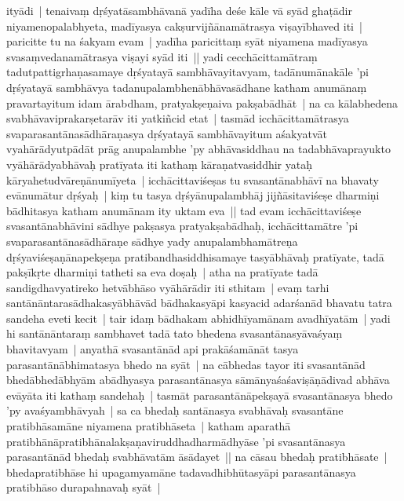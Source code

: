 \documentclass[article,a4paper]{memoir}
\begin{document}
	  \pstart ityā\-di | tenaivaṃ dṛśyatā\-sambhā\-vanā\- yadī\-ha deśe kā\-le vā\- syā\-d ghaṭā\-dir niyamenopalabhyeta, madī\-yasya cakṣurvijñā\-namā\-trasya viṣayī\-bhaved iti | paricitte tu na śakyam evam | yadī\-ha paricittaṃ syā\-t niyamena madī\-yasya svasaṃvedanamā\-trasya viṣayi syā\-d iti || \label{thakur75-146.26} yadi cecchā\-cittamā\-traṃ tadutpattigrhaṇasamaye dṛśyatayā\- sambhā\-vayitavyam, tadā\-numā\-nakā\-le 'pi dṛśyatayā\- sambhā\-vya tadanupalambhenā\-bhā\-vasā\-dhane katham anumā\-naṃ pravartayitum idam ā\-rabdham, pratyakṣeṇaiva pakṣabā\-dhā\-t | na ca kā\-labhedena svabhā\-vaviprakarṣetarā\-v iti yatkiñcid etat | tasmā\-d icchā\-cittamā\-trasya svaparasantā\-nasā\-dhā\-raṇasya dṛśyatayā\- sambhā\-vayitum aśakyatvā\-t vyahā\-rā\-dyutpā\-dā\-t prā\-g anupalambhe 'py abhā\-vasiddhau na tadabhā\-vaprayukto vyā\-hā\-rā\-dyabhā\-vaḥ pratī\-yata iti kathaṃ kā\-raṇatvasiddhir yataḥ kā\-ryahetudvā\-reṇā\-numī\-yeta | icchā\-cittaviśeṣas tu svasantā\-nabhā\-vī\- na bhavaty evā\-numā\-tur dṛśyaḥ | kiṃ tu tasya dṛśyā\-nupalambhā\-j jijñā\-sitaviśeṣe dharmiṇi bā\-dhitasya katham anumā\-nam ity uktam eva || \label{thakur75-147.1} tad evam icchā\-cittaviśeṣe svasantā\-nabhā\-vini sā\-dhye pakṣasya pratyakṣabā\-dhaḥ, icchā\-cittamā\-tre 'pi svaparasantā\-nasā\-dhā\-raṇe sā\-dhye yady anupalambhamā\-treṇa dṛśyaviśeṣaṇā\-napekṣeṇa pratibandhasiddhisamaye tasyā\-bhā\-vaḥ pratī\-yate, tadā\- pakṣī\-kṛte dharmiṇi tatheti sa eva doṣaḥ | atha na pratī\-yate tadā\- sandigdhavyatireko hetvā\-bhā\-so vyā\-hā\-rā\-dir iti sthitam | \label{thakur75-147.6} evaṃ tarhi santā\-nā\-ntarasā\-dhakasyā\-bhā\-vā\-d bā\-dhakasyā\-pi kasyacid adarśanā\-d bhavatu tatra sandeha eveti kecit | tair idaṃ bā\-dhakam abhidhī\-yamā\-nam avadhī\-yatā\-m | yadi hi santā\-nā\-ntaraṃ sambhavet tadā\- tato bhedena svasantā\-nasyā\-vaśyaṃ bhavitavyam | anyathā\- svasantā\-nā\-d api prakā\-śamā\-nā\-t tasya parasantā\-nā\-bhimatasya bhedo na syā\-t | na cā\-bhedas tayor iti svasantā\-nā\-d bhedā\-bhedā\-bhyā\-m abā\-dhyasya parasantā\-nasya sā\-mā\-nyaśaśaviṣā\-ṇā\-divad abhā\-va evā\-yā\-ta iti kathaṃ sandehaḥ | tasmā\-t parasantā\-nā\-pekṣayā\- svasantā\-nasya bhedo 'py avaśyambhā\-vyah | sa ca bhedaḥ santā\-nasya svabhā\-vaḥ svasantā\-ne pratibhā\-samā\-ne niyamena pratibhā\-seta | katham aparathā\- pratibhā\-nā\-pratibhā\-nalakṣaṇaviruddhadharmā\-dhyā\-se 'pi svasantā\-nasya parasantā\-nā\-d bhedaḥ svabhā\-vatā\-m ā\-sā\-dayet || \label{thakur75-147.15} na cā\-sau bhedaḥ pratibhā\-sate | bhedapratibhā\-se hi upagamyamā\-ne tadavadhibhū\-tasyā\-pi parasantā\-nasya pratibhā\-so durapahnavaḥ syā\-t |
	\pend
      
\end{document}
